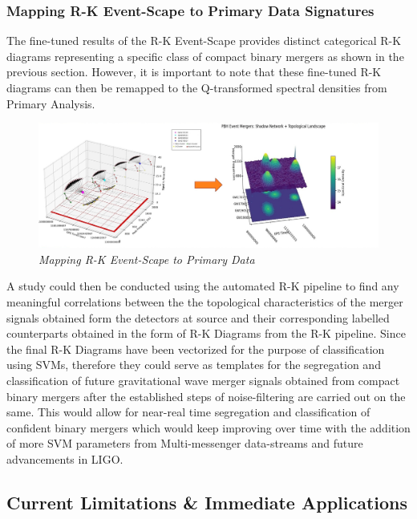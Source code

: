 \subsubsection{ Mapping R-K Event-Scape to Primary Data Signatures}
 
 The fine-tuned results of the R-K Event-Scape provides distinct categorical R-K diagrams representing a specific class of compact binary mergers as shown in the previous section. However, it is important to note that these fine-tuned R-K diagrams can then be remapped to the Q-transformed spectral densities from Primary Analysis.  
 
 \begin{figure}[H]
 	\centering
 	\includegraphics[width=1.0\linewidth]{images/76_Mapping R_K eventScape to Primary Data.jpg}
	\caption{\textit{Mapping R-K Event-Scape to Primary Data}}
 	\label{fig:LIGO17_PlaceHolder_fig}
 \end{figure}

A study could then be conducted using the automated R-K pipeline to find any meaningful correlations between the the topological characteristics of the merger signals obtained form the detectors at source and their corresponding labelled counterparts obtained in the form of R-K Diagrams from the R-K pipeline. Since the final R-K Diagrams have been vectorized for the purpose of classification using SVMs, therefore they could serve as templates for the segregation and classification of future gravitational wave merger signals  obtained from compact binary mergers after the established steps of noise-filtering are carried out on the same. This would allow for near-real time segregation and classification of confident binary mergers which would keep improving over time with the addition of more SVM parameters from Multi-messenger data-streams and future advancements in LIGO. 

\subsection{Current Limitations \& Immediate Applications}

